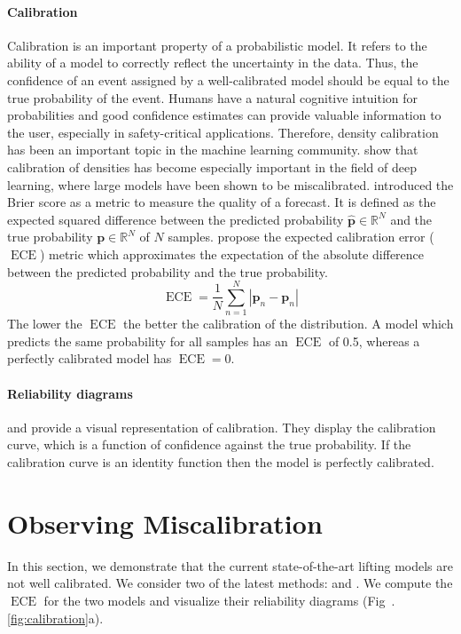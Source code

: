 \documentclass{article} \usepackage{iclr2023_conference,times}
\def\vp{{\bm{p}}}
\newcommand{\R}{\mathbb{R}}
\begin{document}
\paragraph{Calibration} Calibration is an important property of a probabilistic model.
It refers to the ability of a model to correctly reflect the uncertainty in the data.
Thus, the confidence of an event assigned by a well-calibrated model should be equal to the true probability of the event.
Humans have a natural cognitive intuition for probabilities \citep{Cosmides1996} and good confidence estimates can provide valuable information to the user, especially in safety-critical applications.
Therefore, density calibration has been an important topic in the machine learning community.
\citet{Guo2017-nv} show that calibration of densities has become especially important in the field of deep learning, where large models have been shown to be miscalibrated.
\citet{Brier1950} introduced the Brier score as a metric to measure the quality of a forecast.
It is defined as the expected squared difference between the predicted probability $\hat{\vp} \in \R^{N}$ and the true probability $\vp \in \R^{N}$ of $N$ samples.
\citet{Naeini2015} propose the expected calibration error ($\operatorname{ECE}$) metric which approximates the expectation of the absolute difference between the predicted probability and the true probability.
\begin{equation}
    \label{eq:ece}
    \operatorname{ECE} = \frac{1}{N} \sum_{n=1}^N \left| \hat{\vp}_n - \vp_n \right|
\end{equation}
The lower the $\operatorname{ECE}$ the better the calibration of the distribution.
A model which predicts the same probability for all samples has an $\operatorname{ECE}$ of 0.5, whereas a perfectly calibrated model has $\operatorname{ECE} = 0$.
\paragraph{Reliability diagrams} \citet{DeGroot1983} and \citet{Niculescu-Mizil2005} provide a visual representation of calibration. They display the calibration curve, which is a function of confidence against the true probability. If the calibration curve is an identity function then the model is perfectly calibrated.

\section{Observing Miscalibration}
\label{sec:observing_miscalibration}
    In this section, we demonstrate that the current state-of-the-art lifting models are not well calibrated.
    We consider two of the latest methods: \citet{Sharma_Varigonda_Bindal_Sharma_Jain_2019} and \citet{Wehrbein_Rudolph_Rosenhahn_Wandt_2021}.
    We compute the $\operatorname{ECE}$ for the two models and visualize their reliability diagrams (Fig~.\ref{fig:calibration}a).
\end{document}
